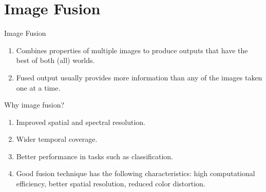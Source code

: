 \documentclass{beamer}
\begin{document}
\section{Image Fusion}
\begin{frame}{Image Fusion}
    \begin{enumerate}
        \item Combines properties of multiple images to produce outputs that have the best of both (all) worlds.
        \item Fused output usually provides more information than any of the images taken one at a time.
    \end{enumerate}
\end{frame}
\begin{frame}{Why image fusion?}
    \begin{enumerate}
        \item Improved spatial and spectral resolution.
        \item Wider temporal coverage.
        \item Better performance in tasks such as classification.
        \item Good fusion technique has the following characteristics: high computational efficiency, better spatial resolution, reduced color distortion.
    \end{enumerate}
\end{frame}
\end{document}
